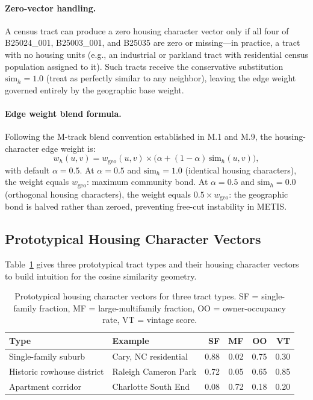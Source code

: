 \paragraph{Zero-vector handling.}
A census tract can produce a zero housing character vector only if all four
of B25024\_001, B25003\_001, and B25035 are zero or missing---in practice, a
tract with no housing units (e.g., an industrial or parkland tract with
residential census population assigned to it).
Such tracts receive the conservative substitution $\mathrm{sim}_h = 1.0$
(treat as perfectly similar to any neighbor), leaving the edge weight
governed entirely by the geographic base weight.

\paragraph{Edge weight blend formula.}
Following the M-track blend convention established in M.1 and M.9, the
housing-character edge weight is:
\begin{equation}
  w_h(u,v) = w_{\mathrm{geo}}(u,v) \times \bigl(\alpha + (1 - \alpha)\,\mathrm{sim}_h(u,v)\bigr),
  \label{eq:blend}
\end{equation}
with default $\alpha = 0.5$.
At $\alpha = 0.5$ and $\mathrm{sim}_h = 1.0$ (identical housing characters),
the weight equals $w_{\mathrm{geo}}$: maximum community bond.
At $\alpha = 0.5$ and $\mathrm{sim}_h = 0.0$ (orthogonal housing characters),
the weight equals $0.5 \times w_{\mathrm{geo}}$: the geographic bond is
halved rather than zeroed, preventing free-cut instability in METIS.

\subsection{Prototypical Housing Character Vectors}

Table~\ref{tab:prototypes} gives three prototypical tract types and their
housing character vectors to build intuition for the cosine similarity geometry.

\begin{table}[ht]
\centering
\caption{Prototypical housing character vectors for three tract types.
  SF = single-family fraction, MF = large-multifamily fraction,
  OO = owner-occupancy rate, VT = vintage score.}
\label{tab:prototypes}
\begin{tabular}{llrrrr}
\toprule
Type & Example & SF & MF & OO & VT \\
\midrule
Single-family suburb & Cary, NC residential & 0.88 & 0.02 & 0.75 & 0.30 \\
Historic rowhouse district & Raleigh Cameron Park & 0.72 & 0.05 & 0.65 & 0.85 \\
Apartment corridor & Charlotte South End & 0.08 & 0.72 & 0.18 & 0.20 \\
\bottomrule
\end{tabular}
\end{table}

